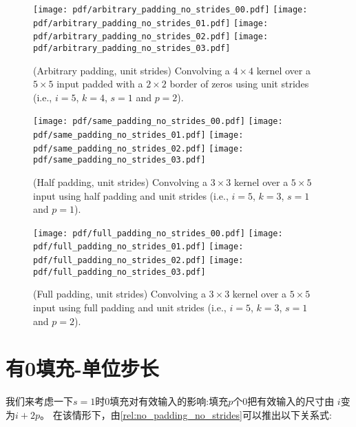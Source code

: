 \documentclass[notitlepage]{report}
\begin{document}
\begin{figure}[p]
    \centering
    \texttt{[image: pdf/arbitrary\_padding\_no\_strides\_00.pdf]}
    \texttt{[image: pdf/arbitrary\_padding\_no\_strides\_01.pdf]}
    \texttt{[image: pdf/arbitrary\_padding\_no\_strides\_02.pdf]}
    \texttt{[image: pdf/arbitrary\_padding\_no\_strides\_03.pdf]}
    \caption{\label{fig:arbitrary_padding_no_strides} (Arbitrary padding, unit
        strides) Convolving a $4 \times 4$ kernel over a $5 \times 5$ input
        padded with a $2 \times 2$ border of zeros using unit strides (i.e.,
        $i = 5$, $k = 4$, $s = 1$ and $p = 2$).}
\end{figure}

\begin{figure}[p]
    \centering
    \texttt{[image: pdf/same\_padding\_no\_strides\_00.pdf]}
    \texttt{[image: pdf/same\_padding\_no\_strides\_01.pdf]}
    \texttt{[image: pdf/same\_padding\_no\_strides\_02.pdf]}
    \texttt{[image: pdf/same\_padding\_no\_strides\_03.pdf]}
    \caption{\label{fig:same_padding_no_strides} (Half padding, unit strides)
        Convolving a $3 \times 3$ kernel over a $5 \times 5$ input using half
        padding and unit strides (i.e., $i = 5$, $k = 3$, $s = 1$ and $p = 1$).}
\end{figure}

\begin{figure}[p]
    \centering
    \texttt{[image: pdf/full\_padding\_no\_strides\_00.pdf]}
    \texttt{[image: pdf/full\_padding\_no\_strides\_01.pdf]}
    \texttt{[image: pdf/full\_padding\_no\_strides\_02.pdf]}
    \texttt{[image: pdf/full\_padding\_no\_strides\_03.pdf]}
    \caption{\label{fig:full_padding_no_strides} (Full padding, unit strides)
        Convolving a $3 \times 3$ kernel over a $5 \times 5$ input using full
        padding and unit strides (i.e., $i = 5$, $k = 3$, $s = 1$ and $p = 2$).}
\end{figure}

\section{有0填充-单位步长}

我们来考虑一下$s = 1$时0填充对有效输入的影响:填充$p$个0把有效输入的尺寸由 $i$变为$i + 2p$。
在该情形下，由\autoref{rel:no_padding_no_strides}可以推出以下关系式:
\end{document}

